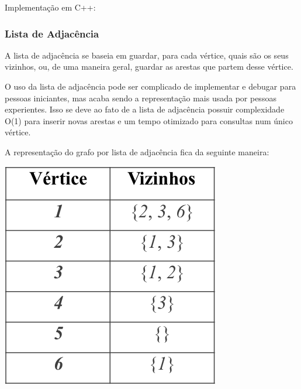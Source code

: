 \documentclass[a4paper,12pt]{article}
\begin{document}
\noindent Implementação em C++:


\subsubsection{Lista de Adjacência}

\indent\indent A lista de adjacência se baseia em guardar, para cada vértice, quais são os seus vizinhos, ou, de uma maneira geral, guardar as arestas que partem desse vértice.

\indent O uso da lista de adjacência pode ser complicado de implementar e debugar para pessoas iniciantes, mas acaba sendo a representação mais usada por pessoas experientes. Isso se deve ao fato de a lista de adjacência possuir complexidade O(1) para inserir novas arestas e um tempo otimizado para consultas num único vértice.

\indent A representação do grafo por lista de adjacência fica da seguinte maneira:

\begin{center}
  \includegraphics[width=\linewidth/2]{figures/grafos/representacao_lista_adj.png}
\end{center}
\end{document}
